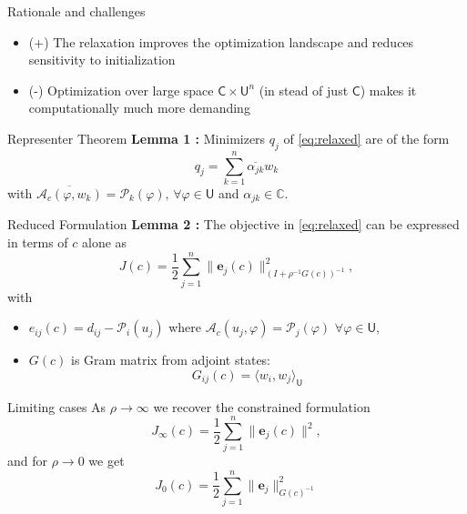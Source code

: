 \documentclass{beamer}
\newcommand{\sU}{\mathsf{U}}
\newcommand{\sC}{\mathsf{C}}
\newcommand{\mA}{\mathcal{A}}
\newcommand{\mP}{\mathcal{P}}
\begin{document}
\begin{frame}{Rationale and challenges}
\vspace{1cm}
\begin{itemize}
  \item (+) The relaxation improves the optimization landscape and reduces sensitivity to initialization
  \item (-) Optimization over large space $\sC \times \sU^n$ (in stead of just $\sC$) makes it computationally much more demanding
\end{itemize}
\end{frame}

\begin{frame}{Representer Theorem}
\textbf{Lemma 1 \cite{van2025analysis}:} Minimizers $q_j$ of \eqref{eq:relaxed} are of the form
\begin{equation*}
q_j = \sum_{k=1}^n \overline{\alpha_{jk}} w_k
\end{equation*}
with $\overline{\mA_c(\varphi, w_k)} = \mP_k(\varphi),\, \forall \varphi\in\sU$ and $\alpha_{jk}\in\mathbb{C}$.
\end{frame}

\begin{frame}{Reduced Formulation}
\textbf{Lemma 2 \cite{van2025analysis}:}
The objective in \eqref{eq:relaxed} can be expressed in terms of $c$ alone as 
\begin{equation*}
J(c) = {\textstyle\frac{1}{2}} \sum_{j=1}^n \|\mathbf{e}_j(c)\|_{(I + \rho^{-1} G(c))^{-1}}^2,
\end{equation*}
with
\begin{itemize}
  \item $e_{ij}(c) = d_{ij}-\mP_i(u_j)$ where $\mA_c(u_j,\varphi)=\mP_j(\varphi)\,\, \forall \varphi\in\sU$,
  \item $G(c)$ is Gram matrix from adjoint states:
\begin{equation*}
G_{ij}(c) = \langle w_i, w_j \rangle_\sU
\end{equation*}
\end{itemize}
\end{frame}

\begin{frame}{Limiting cases}
As $\rho\rightarrow\infty$ we recover the constrained formulation
\begin{equation*}
J_\infty(c) = {\textstyle\frac{1}{2}} \sum_{j=1}^n \|\mathbf{e}_j(c)\|^2,
\end{equation*}
and for $\rho\rightarrow 0$ we get
\begin{equation*}
J_0(c) = {\textstyle\frac{1}{2}} \sum_{j=1}^n \|\mathbf{e}_j\|_{G(c)^{-1}}^2
\end{equation*}
\end{frame}
\end{document}
